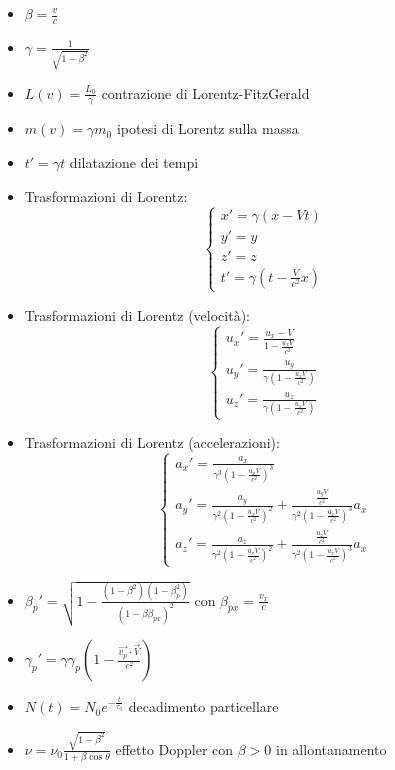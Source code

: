 \documentclass[a4paper]{article}
\begin{document}
        \begin{itemize}
            \item $\beta=\frac{v}{c}$
            \item $\gamma=\frac{1}{\sqrt{1-\beta^2}}$
            \item $L(v)=\frac{L_0}{\gamma}$ contrazione di Lorentz-FitzGerald
            \item $m(v)=\gamma m_0$ ipotesi di Lorentz sulla massa
            \item $t'=\gamma t$ dilatazione dei tempi
            \item Trasformazioni di Lorentz:\\
                $$\begin{cases}
                    x'=\gamma(x-Vt)\\
                    y'=y\\
                    z'=z\\
                    t'=\gamma\left(t-\frac{V}{c^2}x\right)
                \end{cases}$$
            \item Trasformazioni di Lorentz (velocità):\\
                $$\begin{cases}
                    u_x'=\frac{u_x-V}{1-\frac{u_xV}{c^2}}\\
                    u_y'=\frac{u_y}{\gamma\left(1-\frac{u_xV}{c^2}\right)}\\
                    u_z'=\frac{u_z}{\gamma\left(1-\frac{u_xV}{c^2}\right)}
                \end{cases}$$
            \item Trasformazioni di Lorentz (accelerazioni):\\
                $$\begin{cases}
                    a_x'=\frac{a_x}{\gamma^3\left(1-\frac{u_xV}{c^2}\right)^3}\\
                    a_y'=\frac{a_y}{\gamma^2\left(1-\frac{u_xV}{c^2}\right)^2}+\frac{\frac{u_yV}{c^2}}{\gamma^2\left(1-\frac{u_xV}{c^2}\right)^3}a_x\\
                    a_z'=\frac{a_z}{\gamma^2\left(1-\frac{u_xV}{c^2}\right)^2}+\frac{\frac{u_zV}{c^2}}{\gamma^2\left(1-\frac{u_xV}{c^2}\right)^3}a_x
                \end{cases}$$
            \item $\beta_p'=\sqrt{1-\frac{(1-\beta^2)(1-\beta_p^2)}{(1-\beta\beta_{px})^2}}$ con $\beta_{px}=\frac{v_x}{c}$
            \item $\gamma_p'=\gamma\gamma_p\left(1-\frac{\vec{v_p}\cdot\vec{V}}{c^2}\right)$
            \item $N(t)=N_0e^{-\frac{t}{\tau_0}}$ decadimento particellare
            \item $\nu=\nu_0\frac{\sqrt{1-\beta^2}}{1+\beta\cos{\theta}}$ effetto Doppler con $\beta>0$ in allontanamento
        \end{itemize}
\end{document}
